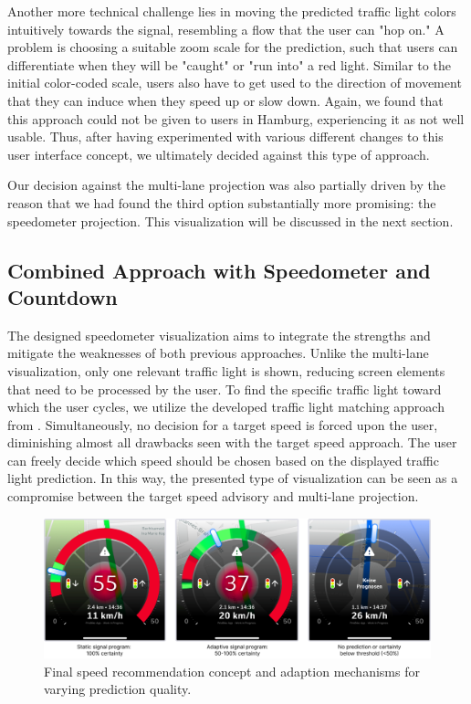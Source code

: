 Another more technical challenge lies in moving the predicted traffic light colors intuitively towards the signal, resembling a flow that the user can "hop on." A problem is choosing a suitable zoom scale for the prediction, such that users can differentiate when they will be "caught" or "run into" a red light. Similar to the initial color-coded scale, users also have to get used to the direction of movement that they can induce when they speed up or slow down. Again, we found that this approach could not be given to users in Hamburg, experiencing it as not well usable. Thus, after having experimented with various different changes to this user interface concept, we ultimately decided against this type of approach. 

Our decision against the multi-lane projection was also partially driven by the reason that we had found the third option substantially more promising: the speedometer projection. This visualization will be discussed in the next section.

\subsection{Combined Approach with Speedometer and Countdown}

The designed speedometer visualization aims to integrate the strengths and mitigate the weaknesses of both previous approaches. Unlike the multi-lane visualization, only one relevant traffic light is shown, reducing screen elements that need to be processed by the user. To find the specific traffic light toward which the user cycles, we utilize the developed traffic light matching approach from . Simultaneously, no decision for a target speed is forced upon the user, diminishing almost all drawbacks seen with the target speed approach. The user can freely decide which speed should be chosen based on the displayed traffic light prediction. In this way, the presented type of visualization can be seen as a compromise between the target speed advisory and multi-lane projection.

\begin{figure}[t]
\centering
\includegraphics[width=\linewidth]{images/speedometer-adaptions.png}
\caption{Final speed recommendation concept and adaption mechanisms for varying prediction quality.}
\label{fig:speedometer-adaptions}
\end{figure}


